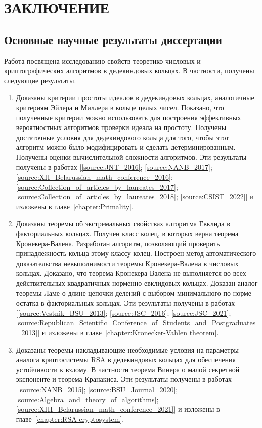 \documentclass[_00_dissertation.tex]{subfiles}
\begin{document}
\onlyinsubfile{
    \renewcommand{\contentsname}{ОГЛАВЛЕНИЕ}
    \setcounter{tocdepth}{3}
    \tableofcontents
}

\chapter*{\MakeUppercase{Заключение}}

\section*{Основные научные результаты диссертации}

Работа посвящена исследованию свойств теоретико-числовых и криптографических алгоритмов в дедекиндовых кольцах.
В частности, получены следующие результаты.
\begin{enumerate}
    \item Доказаны критерии простоты идеалов в дедекиндовых кольцах, аналогичные критериям Эйлера и Миллера в кольце целых чисел.
    Показано, что полученные критерии можно использовать для построения эффективных вероятностных алгоритмов проверки идеала на простоту.
    Получены достаточные условия для дедекиндового кольца для того, чтобы этот алгоритм можно было модифицировать и сделать детерминированным.
    Получены оценки вычислительной сложности алгоритмов.
    Эти результаты получены в работах [\ref{source:JNT_2016}; \ref{source:NANB_2017}; \ref{source:XII_Belarussian_math_conference_2016}; \ref{source:Collection_of_articles_by_laureates_2017}; \ref{source:Collection_of_articles_by_laureates_2018}; \ref{source:CSIST_2022}] и изложены в главе~\ref{chapter:Primality}.

    \item Доказаны теоремы об экстремальных свойствах алгоритма Евклида в факториальных кольцах.
    Получен класс колец, в которых верна теорема Кронекера-Валена.
    Разработан алгоритм, позволяющий проверить принадлежность кольца этому классу колец.
    Построен метод автоматического доказательства невыполнимости теоремы Кронекера-Валена в числовых кольцах.
    Доказано, что теорема Кронекера-Валена не выполняется во всех действительных квадратичных норменно-евклидовых кольцах.
    Доказан аналог теоремы Ламе о длине цепочки делений с выбором минимального по норме остатка в факториальных кольцах.
    Эти результаты получены в работах [\ref{source:Vestnik_BSU_2013}; \ref{source:JSC_2016}; \ref{source:JSC_2021}; \ref{source:Republican_Scientific_Conference_of_Students_and_Postgraduates_2013}] и изложены в главе~\ref{chapter:Kronecker-Vahlen theorem}.

    \item Доказаны теоремы накладывающие необходимые условия на параметры аналога криптосистемы RSA в дедекиндовых кольцах для обеспечения устойчивости к взлому.
    В частности теорема Винера о малой секретной экспоненте и теорема Кранакиса.
    Эти результаты получены в работах [\ref{source:NANB_2015}; \ref{source:BSU_Journal_2020}; \ref{source:Algebra_and_theory_of_algorithms}; \ref{source:XIII_Belarussian_math_conference_2021}] и изложены в главе~\ref{chapter:RSA-cryptosystem}.
\end{enumerate}
\end{document}
